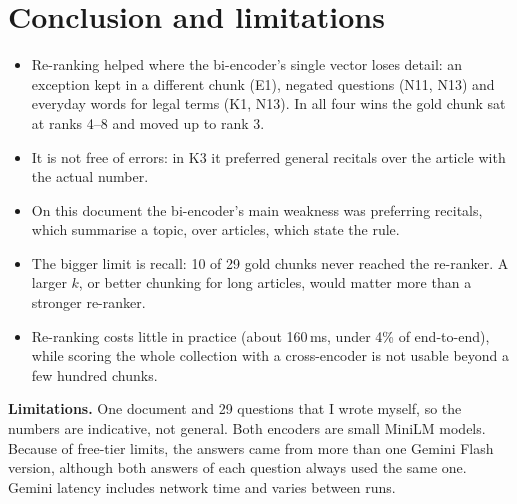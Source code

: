 \documentclass[10pt,a4paper]{article}
\begin{document}
\section{Conclusion and limitations}

\begin{itemize}
\item Re-ranking helped where the bi-encoder's single vector loses detail: an exception kept in a different chunk (E1), negated questions (N11, N13) and everyday words for legal terms (K1, N13). In all four wins the gold chunk sat at ranks 4--8 and moved up to rank 3.
\item It is not free of errors: in K3 it preferred general recitals over the article with the actual number.
\item On this document the bi-encoder's main weakness was preferring recitals, which summarise a topic, over articles, which state the rule.
\item The bigger limit is recall: 10 of 29 gold chunks never reached the re-ranker. A larger $k$, or better chunking for long articles, would matter more than a stronger re-ranker.
\item Re-ranking costs little in practice (about 160\,ms, under 4\% of end-to-end), while scoring the whole collection with a cross-encoder is not usable beyond a few hundred chunks.
\end{itemize}

\textbf{Limitations.} One document and 29 questions that I wrote myself, so the numbers are indicative, not general.
Both encoders are small MiniLM models.
Because of free-tier limits, the answers came from more than one Gemini Flash version, although both answers of each question always used the same one.
Gemini latency includes network time and varies between runs.
\end{document}
